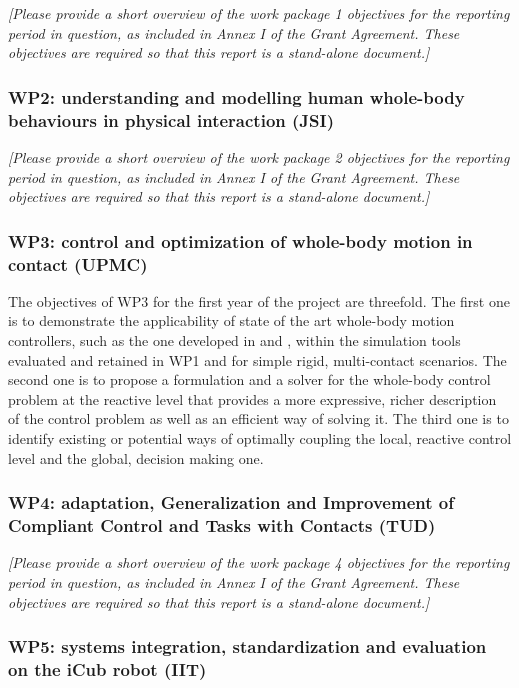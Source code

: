 \documentclass[12pt,a4paper,twoside]{article}
\begin{document}
\emph{\color{red}[Please provide a short overview of the work package 1 objectives for the reporting period in question, as included in Annex I of the Grant Agreement. These objectives are required so that this report is a stand-alone document.]}

\subsubsection{WP2: understanding and modelling human whole-body behaviours in physical interaction (JSI)}

\emph{\color{red}[Please provide a short overview of the work package 2 objectives for the reporting period in question, as included in Annex I of the Grant Agreement. These objectives are required so that this report is a stand-alone document.]}

\subsubsection{WP3: control and optimization of whole-body motion in contact (UPMC)}

The objectives of WP3 for the first year of the project are threefold. The first one is to demonstrate the applicability of state of the art whole-body motion controllers, such as the one developed in \cite{salini2012} and \cite{delprete2013}, within the simulation tools evaluated and retained in WP1 and for simple rigid, multi-contact scenarios. The second one is to propose a formulation and a solver for the whole-body control problem at the reactive level that provides a more expressive, richer description of the control problem as well as an efficient way of solving it. The third one is to identify existing or potential ways of optimally coupling the local, reactive control level and the global, decision making one.

\subsubsection{WP4: adaptation, Generalization and Improvement of Compliant Control and Tasks with Contacts (TUD)}

\emph{\color{red}[Please provide a short overview of the work package 4 objectives for the reporting period in question, as included in Annex I of the Grant Agreement. These objectives are required so that this report is a stand-alone document.]}

\subsubsection{WP5: systems integration, standardization and evaluation on the iCub robot (IIT)}
\end{document}
